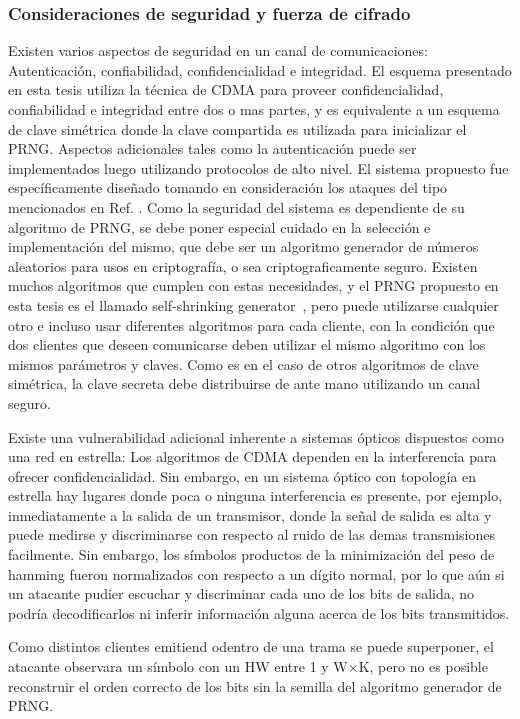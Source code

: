 \subsubsection{Consideraciones de seguridad y fuerza de cifrado}\label{Seguridad-fuerza}
Existen varios aspectos de seguridad en un canal de comunicaciones: Autenticación, confiabilidad, confidencialidad e integridad.
El esquema presentado en esta tesis utiliza la técnica de CDMA para proveer confidencialidad, confiabilidad e integridad entre dos o mas partes, y es equivalente a un esquema de clave simétrica donde la clave compartida es utilizada para inicializar el PRNG. Aspectos adicionales tales como la autenticación puede ser implementados luego utilizando protocolos de alto nivel.
El sistema propuesto fue específicamente diseñado tomando en consideración los ataques del tipo mencionados en Ref. \cite{Shake:05}.
Como la seguridad del sistema es dependiente de su algoritmo de PRNG, se debe poner especial cuidado en la selección e implementación del mismo, que debe ser un algoritmo generador de números aleatorios para usos en criptografía, o sea criptograficamente seguro. Existen muchos algoritmos que cumplen con estas necesidades, y el PRNG propuesto en esta tesis es el llamado self-shrinking generator~\cite{Meier:94}, pero puede utilizarse cualquier otro e incluso usar diferentes algoritmos para cada cliente, con la condición que dos clientes que deseen comunicarse deben utilizar el mismo algoritmo con los mismos parámetros y claves.
Como es en el caso de otros algoritmos de clave simétrica, la clave secreta debe distribuirse de ante mano utilizando un canal seguro.

Existe una vulnerabilidad adicional inherente a sistemas ópticos dispuestos como una red en estrella: Los algoritmos de CDMA dependen en la interferencia para ofrecer confidencialidad. Sin embargo, en un sistema óptico con topología en estrella hay lugares donde poca o ninguna interferencia es presente, por ejemplo, inmediatamente a la salida de un transmisor, donde la señal de salida es alta y puede medirse y discriminarse con respecto al ruido de las demas transmisiones facilmente.
Sin embargo, los símbolos productos de la minimización del peso de hamming fueron normalizados con respecto a un dígito normal, por lo que aún si un atacante pudier escuchar y discriminar cada uno de los bits de salida, no podría decodificarlos ni inferir información alguna acerca de los bits transmitidos.

Como distintos clientes emitiend odentro de una trama se puede superponer, el atacante observara un símbolo con un HW entre 1 y W$\times$K, pero no es posible reconstruir el orden correcto de los bits sin la semilla del algoritmo generador de PRNG.

